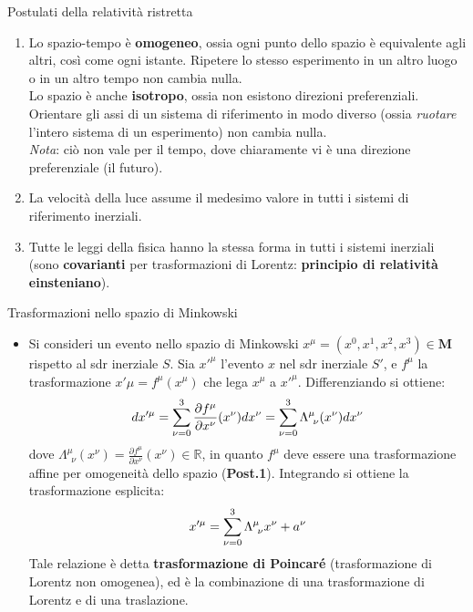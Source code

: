 \documentclass[a4_2,grid,frame]{flashcards}
\newenvironment{cartaflash}
    {\vspace{-15pt}
    \begin{itemize}
    }
    {
    \end{itemize}
    }
\begin{document}
\begin{flashcard}[Postulati]{Postulati della relatività ristretta}
\begin{enumerate}
    \item Lo spazio-tempo è \textbf{omogeneo}, ossia ogni punto dello spazio è equivalente agli altri, così come ogni istante. Ripetere lo stesso esperimento in un altro luogo o in un altro tempo non cambia nulla.\\
    Lo spazio è anche \textbf{isotropo}, ossia non esistono direzioni preferenziali. Orientare gli assi di un sistema di riferimento in modo diverso (ossia \textit{ruotare} l'intero sistema di un esperimento) non cambia nulla.\\
    \textit{Nota}: ciò non vale per il tempo, dove chiaramente vi è una direzione preferenziale (il futuro).
    \item La velocità della luce assume il medesimo valore in tutti i sistemi di riferimento inerziali.
    \item Tutte le leggi della fisica hanno la stessa forma in tutti i sistemi inerziali (sono \textbf{covarianti} per trasformazioni di Lorentz: \textbf{principio di relatività einsteniano}).
\end{enumerate}
\end{flashcard}

\begin{flashcard}[Trasformazioni]{Trasformazioni nello spazio di Minkowski}
\begin{cartaflash}
\item Si consideri un evento nello spazio di Minkowski $x^\mu = (x^0, x^1, x^2, x^3) \in \bm{M}$ rispetto al sdr inerziale $S$. Sia $x'^\mu$ l'evento $x$ nel sdr inerziale $S'$, e $f^\mu$ la trasformazione $x'\mu = f^\mu (x^\mu)$ che lega $x^\mu$ a $x'^\mu$. Differenziando si ottiene:
\vspace{-10pt}
\[
dx'^\mu = \sum_{\nu=0}^3 \frac{\partial f^\mu}{\partial x^\nu}(x^\nu)dx^\nu = \sum_{\nu=0}^3 \Lambda^\mu_{\>\>\nu}(x^\nu)dx^\nu
\vspace{-10pt}
\]
dove $\Lambda^\mu_{\>\>\nu}(x^\nu) = \frac{\partial f^\mu}{\partial x^\nu}(x^\nu) \in \mathbb{R}$, in quanto $f^\mu$ deve essere una trasformazione affine per omogeneità dello spazio (\textbf{Post.1}). %
Integrando si ottiene la trasformazione esplicita:
\vspace{-10pt}
\[
x'^\mu = \sum_{\nu=0}^3 \Lambda^\mu_{\>\>\nu} x^\nu + a^\nu
\vspace{-10pt}
\]
Tale relazione è detta \textbf{trasformazione di Poincaré} (trasformazione di Lorentz non omogenea), ed è la combinazione di una trasformazione di Lorentz e di una traslazione. 
\end{cartaflash}
\end{flashcard}
\end{document}
